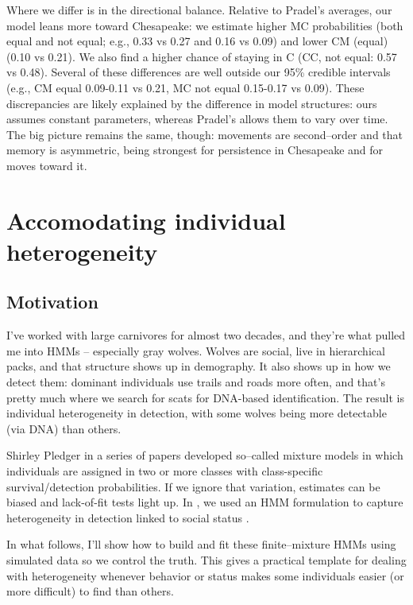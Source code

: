 \documentclass[
  12pt,
]{krantz}
\begin{document}
Where we differ is in the directional balance. Relative to Pradel's averages, our model leans more toward Chesapeake: we estimate higher MC probabilities (both equal and not equal; e.g., 0.33 vs 0.27 and 0.16 vs 0.09) and lower CM (equal) (0.10 vs 0.21). We also find a higher chance of staying in C (CC, not equal: 0.57 vs 0.48). Several of these differences are well outside our 95\% credible intervals (e.g., CM equal 0.09-0.11 vs 0.21, MC not equal 0.15-0.17 vs 0.09). These discrepancies are likely explained by the difference in model structures: ours assumes constant parameters, whereas Pradel's allows them to vary over time. The big picture remains the same, though: movements are second--order and that memory is asymmetric, being strongest for persistence in Chesapeake and for moves toward it.

\section{Accomodating individual heterogeneity}\label{indhet}

\subsection{Motivation}\label{motivation-5}

I've worked with large carnivores for almost two decades, and they're what pulled me into HMMs -- especially gray wolves. Wolves are social, live in hierarchical packs, and that structure shows up in demography. It also shows up in how we detect them: dominant individuals use trails and roads more often, and that's pretty much where we search for scats for DNA-based identification. The result is individual heterogeneity in detection, with some wolves being more detectable (via DNA) than others.

Shirley Pledger in a series of papers developed so--called mixture models in which individuals are assigned in two or more classes with class-specific survival/detection probabilities. If we ignore that variation, estimates can be biased and lack-of-fit tests light up. In \citet{cubaynes_importance_2010}, we used an HMM formulation to capture heterogeneity in detection linked to social status \citep[see also][]{pradel2009}.

In what follows, I'll show how to build and fit these finite--mixture HMMs using simulated data so we control the truth. This gives a practical template for dealing with heterogeneity whenever behavior or status makes some individuals easier (or more difficult) to find than others.
\end{document}
